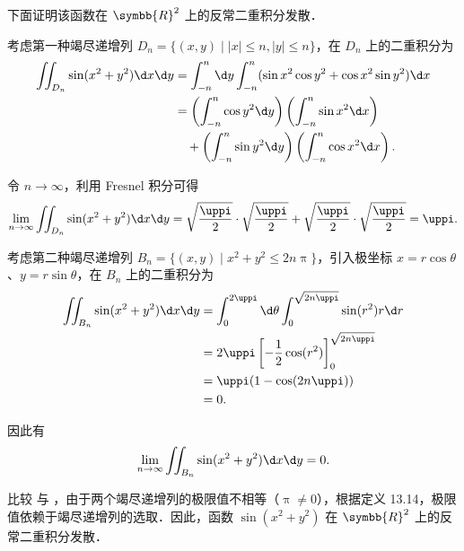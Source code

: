 \begin{myproof}
    下面证明该函数在 $\symbb{R}^2$ 上的反常二重积分发散．

    考虑第一种竭尽递增列 $D_n = \{ (x,y) \mid |x| \leqslant n, |y| \leqslant n \}$，在 $D_n$ 上的二重积分为
    \begin{equation}
        \begin{aligned}
            \iint_{D_n} \sin(x^2 + y^2) \d x \d y & = \int_{-n}^{n} \d y \int_{-n}^{n} (\sin x^2 \cos y^2 + \cos x^2 \sin y^2) \d x                \\
                                                  & = \left( \int_{-n}^{n} \cos y^2 \d y \right) \left( \int_{-n}^{n} \sin x^2 \d x \right)        \\
                                                  & \quad + \left( \int_{-n}^{n} \sin y^2 \d y \right) \left( \int_{-n}^{n} \cos x^2 \d x \right).
        \end{aligned}
    \end{equation}

    令 $n \to \infty$，利用 Fresnel 积分可得
    \begin{equation}
        \lim_{n\to\infty} \iint_{D_n} \sin(x^2 + y^2) \d x \d y = \sqrt{\frac{\uppi}{2}} \cdot \sqrt{\frac{\uppi}{2}} + \sqrt{\frac{\uppi}{2}} \cdot \sqrt{\frac{\uppi}{2}} = \uppi.
        \label{eq:limit-Dn}
    \end{equation}

    考虑第二种竭尽递增列 $B_n = \{ (x,y) \mid x^2 + y^2 \leqslant 2n\uppi \}$，引入极坐标 $x = r \cos \theta$、$y = r \sin \theta$，在 $B_n$ 上的二重积分为
    \begin{equation}
        \begin{aligned}
            \iint_{B_n} \sin(x^2 + y^2) \d x \d y & = \int_0^{2\uppi} \d \theta \int_0^{\sqrt{2n\uppi}} \sin(r^2) r \d r \\
                                                  & = 2\uppi \left[ -\frac{1}{2} \cos(r^2) \right]_0^{\sqrt{2n\uppi}}    \\
                                                  & = \uppi (1 - \cos(2n\uppi))                                          \\
                                                  & = 0.
        \end{aligned}
    \end{equation}

    因此有
    \begin{equation}
        \lim_{n\to\infty} \iint_{B_n} \sin(x^2 + y^2) \d x \d y = 0.
        \label{eq:limit-Bn}
    \end{equation}

    比较  与 ，由于两个竭尽递增列的极限值不相等（$\uppi \neq 0$），根据定义 13.14，极限值依赖于竭尽递增列的选取．因此，函数 $\sin(x^2 + y^2)$ 在 $\symbb{R}^2$ 上的反常二重积分发散．
\end{myproof}

\endinput
